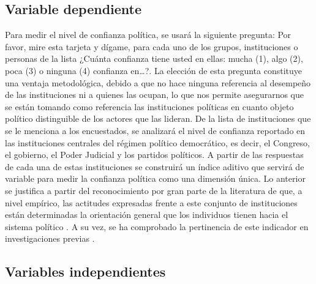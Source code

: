 \documentclass[12pt,twoside]{templates/facsothesis}
\begin{document}
\subsection{Variable dependiente}\label{variable-dependiente}

Para medir el nivel de confianza política, se usará la siguiente pregunta: Por favor, mire esta tarjeta y dígame, para cada uno de los grupos, instituciones o personas de la lista ¿Cuánta confianza tiene usted en ellas: mucha (1), algo (2), poca (3) o ninguna (4) confianza en\ldots?. La elección de esta pregunta constituye una ventaja metodológica, debido a que no hace ninguna referencia al desempeño de las instituciones ni a quienes las ocupan, lo que nos permite asegurarnos que se están tomando como referencia las instituciones políticas en cuanto objeto político distinguible de los actores que las lideran. De la lista de instituciones que se le menciona a los encuestados, se analizará el nivel de confianza reportado en las instituciones centrales del régimen político democrático, es decir, el Congreso, el gobierno, el Poder Judicial y los partidos políticos. A partir de las respuestas de cada una de estas instituciones se construirá un índice aditivo que servirá de variable para medir la confianza política como una dimensión única. Lo anterior se justifica a partir del reconocimiento por gran parte de la literatura de que, a nivel empírico, las actitudes expresadas frente a este conjunto de instituciones están determinadas la orientación general que los individuos tienen hacia el sistema político \citep{marienMeasuringPoliticalTrust2013, zmerliPoliticalTrust2022}. A su vez, se ha comprobado la pertinencia de este indicador en investigaciones previas \citep{bargstedSocialPoliticalTrust2023, zmerliIncomeInequalityDistributive2015}.

\subsection{Variables independientes}\label{variables-independientes}
\end{document}
